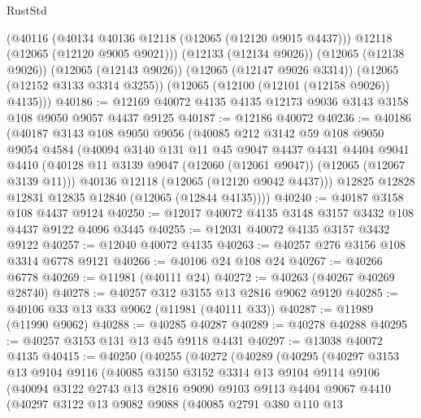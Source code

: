 \begin{lexlean}{RustStd}
\begin{coremodule}
      (@40116
        (@40134 @40136 @12118 (@12065 (@12120 @9015 @4437)))
        @12118
        (@12065 (@12120 @9005 @9021)))
      (@12133 (@12134 @9026))
      (@12065 (@12138 @9026))
      (@12065 (@12143 @9026))
      (@12065 (@12147 @9026 @3314))
      (@12065 (@12152 @3133 @3314 @3255))
      (@12065 (@12100 (@12101 (@12158 @9026)) @4135)))
@40186 := @12169 @40072 @4135 @4135 @12173 @9036 @3143 @3158 @108 @9050 @9057 @4437 @9125
@40187 := @12186 @40072
@40236 := @40186
    (@40187
      @3143
      @108
      @9050
      @9056
      (@40085
        @212
        @3142
        @59
        @108
        @9050
        @9054
        @4584
        (@40094
          @3140
          @131
          @11
          @45
          @9047
          @4437
          @4431
          @4404
          @9041
          @4410
          (@40128 @11 @3139 @9047 (@12060 (@12061 @9047)) (@12065 (@12067 @3139 @11)))
          @40136
          @12118
          (@12065 (@12120 @9042 @4437)))
        @12825
        @12828
        @12831
        @12835
        @12840
        (@12065 (@12844 @4135))))
@40240 := @40187 @3158 @108 @4437 @9124
@40250 := @12017 @40072 @4135 @3148 @3157 @3432 @108 @4437 @9122 @4096 @3445
@40255 := @12031 @40072 @4135 @3157 @3432 @9122
@40257 := @12040 @40072 @4135
@40263 := @40257 @276 @3156 @108 @3314 @6778 @9121
@40266 := @40106 @24 @108 @24
@40267 := @40266 @6778
@40269 := @11981 (@40111 @24)
@40272 := @40263 (@40267 @40269 @28740)
@40278 := @40257 @312 @3155 @13 @2816 @9062 @9120
@40285 := @40106 @33 @13 @33 @9062 (@11981 (@40111 @33))
@40287 := @11989 (@11990 @9062)
@40288 := @40285 @40287
@40289 := @40278 @40288
@40295 := @40257 @3153 @131 @13 @45 @9118 @4431
@40297 := @13038 @40072 @4135
@40415 := @40250
    (@40255
      (@40272
        (@40289
          (@40295
            (@40297
              @3153
              @13
              @9104
              @9116
              (@40085
                @3150
                @3152
                @3314
                @13
                @9104
                @9114
                @9106
                (@40094
                  @3122
                  @2743
                  @13
                  @2816
                  @9090
                  @9103
                  @9113
                  @4404
                  @9067
                  @4410
                  (@40297
                    @3122
                    @13
                    @9082
                    @9088
                    (@40085
                      @2791
                      @380
                      @110
                      @13

\end{coremodule}
\end{lexlean}
